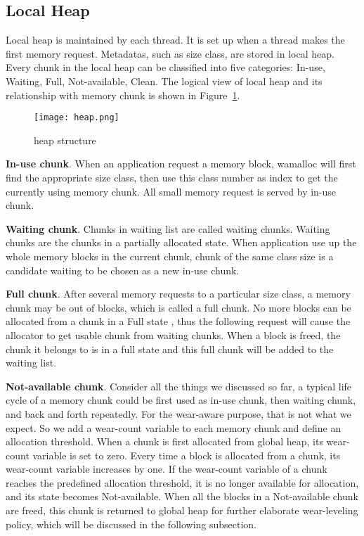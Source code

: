 \documentclass{vldb}
\begin{document}
\subsection{Local Heap}

Local heap is maintained by each thread. 
It is set up when a thread makes the first memory request.
Metadatas, such as size class, are stored in local heap. 
Every chunk in the local heap can be classified into five categories: In-use, Waiting, Full, Not-available, Clean.
The logical view of local heap and its relationship with memory chunk is shown in Figure~\ref{fig:heap}.

\begin{figure}[h]
\centering
\texttt{[image: heap.png]}
\caption{heap structure}
\label{fig:heap}
\end{figure}

\textbf{In-use chunk}. 
When an application request a memory block, wamalloc will first find the appropriate size class, then use this class number as index to get the currently using memory chunk. 
All small memory request is served by in-use chunk.

\textbf{Waiting chunk}. 
Chunks in waiting list are called waiting chunks. 
Waiting chunks are the chunks in a partially allocated state. 
When application use up the whole memory blocks in the current chunk, chunk of the same class size is a candidate waiting to be chosen as a new in-use chunk.

\textbf{Full chunk}. 
After several memory requests to a particular size class, a memory chunk may be out of blocks, which is called a full chunk.
No more blocks can be allocated from a chunk in a Full state , thus the following request will cause the allocator to get usable chunk from waiting chunks.
When a block is freed, the chunk it belongs to is in a full state and this full chunk will be added to the waiting list.

\textbf{Not-available chunk}.
Consider all the things we discussed so far, a typical life cycle of a memory chunk could be first used as in-use chunk, then waiting chunk, and back and forth repeatedly. 
For the wear-aware purpose, that is not what we expect. 
So we add a wear-count variable to each memory chunk and define an allocation threshold. 
When a chunk is first allocated from global heap, its wear-count variable is set to zero.
Every time a block is allocated from a chunk, its wear-count variable increases by one. 
If the wear-count variable of a chunk reaches the predefined allocation threshold, it is no longer available for allocation, and its state becomes Not-available. 
When all the blocks in a Not-available chunk are freed, this chunk is returned to global heap for further elaborate wear-leveling policy, which will be discussed in the following subsection.
\end{document}
